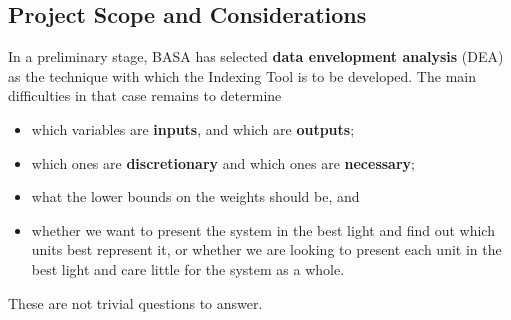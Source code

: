 \subsection{Project Scope and Considerations}
In a preliminary stage, BASA has selected \textbf{data envelopment analysis} (DEA) as the technique with which the Indexing Tool is to be developed. The main difficulties in that case remains to determine
\begin{itemize}[noitemsep]
\item which variables are \textbf{inputs}, and which are \textbf{outputs};
\item which ones are \textbf{discretionary} and which ones are \textbf{necessary};
\item what the lower bounds on the weights should be, and 
\item whether we want to present the system in the best light and find out which units best represent it, or whether we are looking to present each unit in the best light and care little for the system as a whole.
\end{itemize}
These are not trivial questions to answer. 
